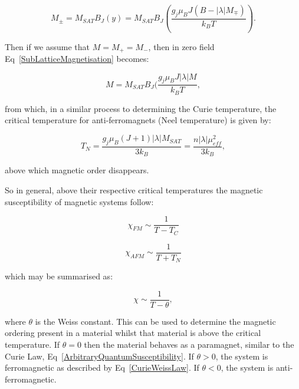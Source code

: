 \begin{equation}
    M_{\pm} = M_{SAT} B_J(y) = M_{SAT} B_J(\frac{g_j \mu_B J(B - |\lambda|M_{\mp})}{k_B T}).
    \label{SubLatticeMagnetisation}
\end{equation}

\noindent Then if we assume that $M = M_+ = M_-$, then in zero field Eq~\ref{SubLatticeMagnetisation} becomes:

\begin{equation}
    M = M_{SAT} B_J(\frac{g_j \mu_B J |\lambda| M}{k_B T},
    \label{SubLatticeMagnetisationZeroField}
\end{equation}

\noindent from which, in a similar process to determining the Curie temperature, the critical temperature for anti-ferromagnets (Neel temperature) is given by:

\begin{equation}
    T_N = \frac{g_j \mu_B (J + 1) |\lambda| M_{SAT}}{3k_B} = \frac{n |\lambda| \mu_{eff}^2}{3k_B},
    \label{NeelTemperature}
\end{equation}

\noindent above which magnetic order disappears.

\noindent So in general, above their respective critical temperatures the magnetic susceptibility of magnetic systems follow:

\begin{equation}
    \chi_{FM} \sim \frac{1}{T - T_C}
    \label{FerromagneticSusceptibility}
\end{equation}

\begin{equation}
    \chi_{AFM} \sim \frac{1}{T + T_N}
\end{equation}

\noindent which may be summarised as:

\begin{equation}
    \chi \sim \frac{1}{T - \theta},
    \label{MagneticSusceptiblityAboveCriticalTemperature}
\end{equation}

\noindent where $\theta$ is the Weiss constant. This can be used to determine the magnetic ordering present in a material whilst that material is above the critical temperature. If $\theta = 0$ then the material behaves as a paramagnet, similar to the Curie Law, Eq~\ref{ArbitraryQuantumSusceptibility}. If $\theta > 0$, the system is ferromagnetic as described by Eq~\ref{CurieWeissLaw}. If $\theta < 0$, the system is anti-ferromagnetic.

